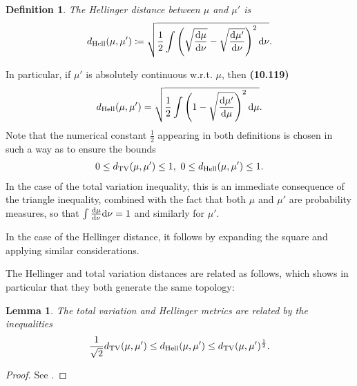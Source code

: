 \documentclass[oneside,11pt]{book}
\numberwithin{equation}{section}
\newtheorem{lemma}{Lemma}[section]
\newtheorem{definition}{Definition}[section]
\begin{document}
\begin{definition}
    The \emph{Hellinger distance} between $\mu$ and $\mu'$ is
    \begin{align*}
        d_{\rm Hell}(\mu,\mu')\coloneqq\sqrt{\frac{1}{2}\int \left(\sqrt{\frac{{\rm d}\mu}{{\rm d}\nu}} - \sqrt{\frac{{\rm d}\mu'}{{\rm d}\nu}}\right)^2{\rm d}\nu}.
    \end{align*}
\end{definition}
In particular, if $\mu'$ is absolutely continuous w.r.t. $\mu$, then \textbf{(10.119)}
\begin{align*}
    d_{\rm Hell}(\mu,\mu') = \sqrt{\frac{1}{2}\int \left(1 - \sqrt{\frac{{\rm d}\mu'}{{\rm d}\mu}}\right)^2{\rm d}\mu}.
\end{align*}
Note that the numerical constant $\frac{1}{2}$ appearing in both definitions is chosen in such a way as to ensure the bounds
\begin{align*}
    0\le d_{\rm TV}(\mu,\mu')\le 1,\ 0\le d_{\rm Hell}(\mu,\mu')\le 1.
\end{align*}
In the case of the total variation inequality, this is an immediate consequence of the triangle inequality, combined with the fact that both $\mu$ and $\mu'$ are probability measures, so that $\int \frac{{\rm d}\mu}{{\rm d}\nu}{\rm d}\nu = 1$ and similarly for $\mu'$.

In the case of the Hellinger distance, it follows by expanding the square and applying similar considerations.

%
The Hellinger and total variation distances are related as follows, which shows in particular that they both generate the same topology:

\begin{lemma}
    The total variation and Hellinger metrics are related by the inequalities
    \begin{align*}
        \frac{1}{\sqrt{2}}d_{\rm TV}(\mu,\mu')\le d_{\rm Hell}(\mu,\mu')\le d_{\rm TV}(\mu,\mu')^{\frac{1}{2}}.
    \end{align*}
\end{lemma}

\begin{proof}
    See \cite[p. 408]{Dashti_Stuart2017}.
\end{proof}
\end{document}
